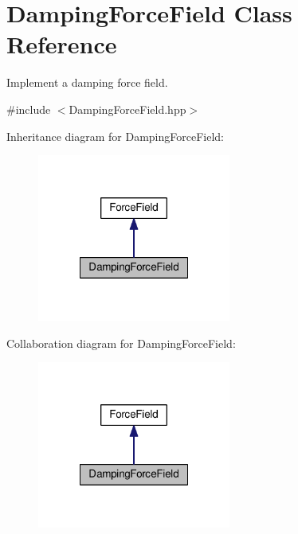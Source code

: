 \hypertarget{classDampingForceField}{\section{Damping\+Force\+Field Class Reference}
\label{classDampingForceField}
}


Implement a damping force field.  




{\ttfamily \#include $<$Damping\+Force\+Field.\+hpp$>$}



Inheritance diagram for Damping\+Force\+Field\+:\nopagebreak
\begin{figure}[H]
\begin{center}
\leavevmode
\includegraphics[width=180pt]{classDampingForceField__inherit__graph}
\end{center}
\end{figure}


Collaboration diagram for Damping\+Force\+Field\+:\nopagebreak
\begin{figure}[H]
\begin{center}
\leavevmode
\includegraphics[width=180pt]{classDampingForceField__coll__graph}
\end{center}
\end{figure}
